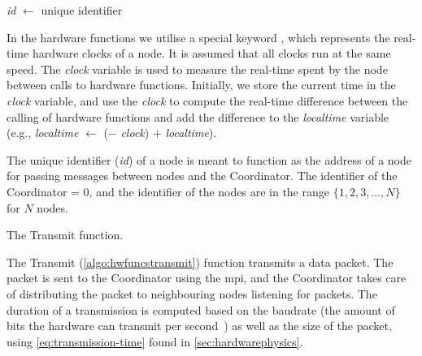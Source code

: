 \textit{id} $\leftarrow$ unique identifier \smallbreak

In the hardware functions we utilise a special keyword \KwNow, which represents the real-time hardware clocks
of a node. It is assumed that all clocks run at the same speed. The \textit{clock} variable is used to measure
the real-time spent by the node between calls to hardware functions. Initially, we store the current time in
the \textit{clock} variable, and use the \textit{clock} to compute the real-time difference between the
calling of hardware functions and add the difference to the \textit{localtime} variable (e.g.,
\textit{localtime} $\leftarrow$ (\KwNow $-$ \textit{clock}) $+$ \textit{localtime}).

The unique identifier (\textit{id}) of a node is meant to function as the address of a node for passing
messages between nodes and the Coordinator. The identifier of the Coordinator = $0$, and the identifier of the
nodes are in the range $\{ 1, 2, 3, \ldots, N \}$ for $N$ nodes.

\begin{algorithm}[ht]
    \DontPrintSemicolon
    

    \caption{The Transmit function.}
    \label{algo:hwfuncstransmit}
\end{algorithm}

The Transmit (\autoref{algo:hwfuncstransmit}) function transmits a data packet. The packet is sent
to the Coordinator using the \gls{mpi}, and the Coordinator takes care of distributing the packet to
neighbouring nodes listening for packets. The duration of a transmission is computed based on the
\gls{baudrate} (the amount of bits the hardware can transmit per second~\cite{website:baudrate-mathworks}) as
well as the size of the packet, using \autoref{eq:transmission-time} found in \autoref{sec:hardwarephysics}.

